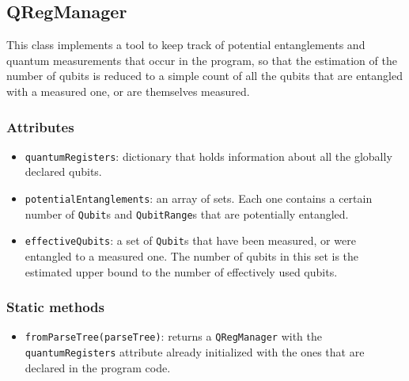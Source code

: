 \documentclass[12pt,a4paper]{report}
\theoremstyle{definition}
\theoremstyle{definition}
\theoremstyle{definition}
\begin{document}
\subsection{QRegManager}
This class implements a tool to keep track of potential entanglements and quantum measurements that occur in the program, so that the estimation of the number of qubits is reduced to a simple count of all the qubits that are entangled with a measured one, or are themselves measured.
\subsubsection{Attributes}
\begin{itemize}
    \itemsep 0em
    \item \texttt{quantumRegisters}: dictionary that holds information about all the globally declared qubits.
    \item \texttt{potentialEntanglements}: an array of sets. Each one contains a certain number of \texttt{Qubit}s and \texttt{QubitRange}s that are potentially entangled.
    \item \texttt{effectiveQubits}: a set of \texttt{Qubit}s that have been measured, or were entangled to a measured one. The number of qubits in this set is the estimated upper bound to the number of effectively used qubits.
\end{itemize}
\subsubsection{Static methods}
\begin{itemize}
    \itemsep 0em
    \item \texttt{fromParseTree(parseTree)}: returns a \texttt{QRegManager} with the \texttt{quantumRegisters} attribute already initialized with the ones that are declared in the program code.
\end{itemize}
\end{document}
